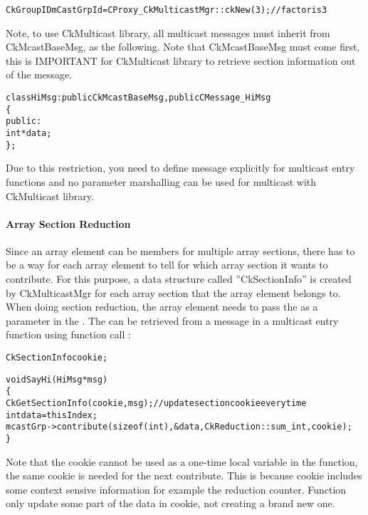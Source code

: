 \begin{alltt}
  CkGroupID mCastGrpId = CProxy_CkMulticastMgr::ckNew(3);   // factor is 3
\end{alltt}

Note, to use CkMulticast library, all multicast messages must inherit from 
CkMcastBaseMsg, as the following.
Note that CkMcastBaseMsg must come first, this is IMPORTANT for CkMulticast 
library to retrieve section information out of the message.


\begin{alltt}
class HiMsg : public CkMcastBaseMsg, public CMessage_HiMsg
\{
public:
  int *data;
\};
\end{alltt}

Due to this restriction, you need to define message explicitly for multicast 
entry functions and no parameter marshalling can be used for multicast with 
CkMulticast library.

\paragraph{Array Section Reduction} 

Since an array element can be members for multiple array sections, 
there has to be a way for each array element to tell for which array
section it wants to contribute. For this purpose, a data structure 
called ''CkSectionInfo'' is created by CkMulticastMgr for each 
array section that the array element belongs to.
When doing section reduction, the array element needs to pass the 
 as a parameter in the . 
The  can be retrieved
from a message in a multicast entry function using function call 
:

\begin{alltt}
  CkSectionInfo cookie;

  void SayHi(HiMsg *msg)
  \{
    CkGetSectionInfo(cookie, msg);     // update section cookie every time
    int data = thisIndex;
    mcastGrp->contribute(sizeof(int), &data, CkReduction::sum_int, cookie);
  \}
\end{alltt}

Note that the cookie cannot be used as a one-time local variable in the 
function, the same cookie is needed for the next contribute. This is 
because cookie includes some context sensive information for example the 
reduction counter. Function  only update some part 
of the data in cookie, not creating a brand new one.

